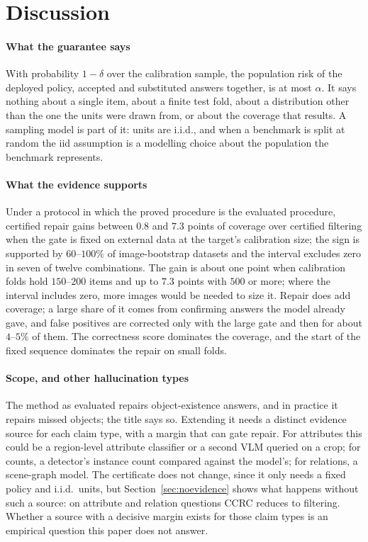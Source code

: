 \section{Discussion}
\label{sec:discussion}

\paragraph{What the guarantee says}
With probability $1-\delta$ over the calibration sample, the population risk of the deployed policy, accepted and
substituted answers together, is at most $\alpha$. It says nothing about a single item, about a finite test fold, about
a distribution other than the one the units were drawn from, or about the coverage that results. A sampling model is
part of it: units are i.i.d., and when a benchmark is split at random the iid assumption is a modelling choice about the population
the benchmark represents.

\paragraph{What the evidence supports}
Under a protocol in which the proved procedure is the evaluated procedure, certified repair gains between $0.8$ and $7.3$ points
of coverage over certified filtering when the gate is fixed on external data at the target's calibration size; the sign is supported by
$60$--$100\%$ of image-bootstrap datasets and the interval excludes zero in seven of twelve combinations. The gain is about one point
when calibration folds hold $150$--$200$ items and up to $7.3$ points with $500$ or more; where the interval includes zero, more images
would be needed to size it. Repair does add coverage; a large share of it
comes from confirming answers the model already gave, and false positives are corrected only with the large gate and then for about
$4$--$5\%$ of them.
The correctness score dominates the coverage, and the start of the fixed sequence dominates the repair on small folds.

\paragraph{Scope, and other hallucination types}
The method as evaluated repairs object-existence answers, and in practice it repairs missed objects; the title says so. Extending it needs a
distinct evidence source for each claim type, with a margin that can gate repair. For attributes this could be a region-level attribute classifier or a
second VLM queried on a crop; for counts, a detector's instance count compared against the model's; for relations, a scene-graph model. The certificate
does not change, since it only needs a fixed policy and i.i.d.\ units, but Section~\ref{sec:noevidence} shows what happens without such a source:
on attribute and relation questions CCRC reduces to filtering. Whether a source with a decisive margin exists for those claim types is an empirical question this
paper does not answer.

